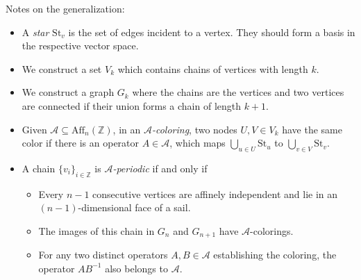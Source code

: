 Notes on the generalization:
\begin{itemize}
  \item
    A \emph{star} $\mathrm{St}_v$ is the set of edges incident to a vertex.
    They should form a basis in the respective vector space.
  \item
    We construct a set $V_k$ which contains chains of vertices with length $k$.
  \item
    We construct a graph $G_k$ where the chains are the vertices and two
    vertices are connected if their union forms a chain of length $k + 1$.
  \item
    Given $\mathcal A ⊆ \mathrm{Aff}_n(ℤ)$,
    in an \emph{$\mathcal A$-coloring},
    two nodes $U, V ∈ V_k$ have the same color if there is an operator $A ∈ \mathcal A$,
    which maps $\bigcup_{u ∈ U} \mathrm{St}_u$ to $\bigcup_{v ∈ V} \mathrm{St}_v$.
  \item
    A chain $\{v_i\}_{i ∈ ℤ}$ is \emph{$\mathcal A$-periodic} if and only if
    \begin{itemize}
      \item Every $n-1$ consecutive vertices are affinely independent
        and lie in an $(n-1)$-dimensional face of a sail.
      \item
        The images of this chain in $G_n$ and $G_{n+1}$ have $\mathcal A$-colorings.
      \item
        For any two distinct operators $A, B ∈ \mathcal A$ establishing the
        coloring, the operator $AB^{-1}$ also belongs to $\mathcal A$.
    \end{itemize}
\end{itemize}
